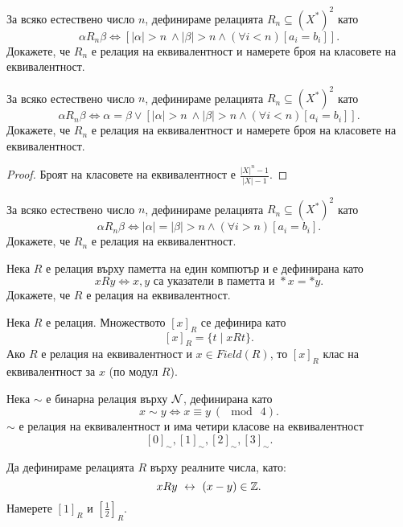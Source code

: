 \begin{problem}
  За всяко естествено число $n$, дефинираме релацията $R_n \subseteq (X^*)^2$ като
  \[\alpha R_n \beta \iff [|\alpha| > n\ \wedge |\beta| > n\wedge (\forall i < n)[a_i = b_i]].\]
  Докажете, че $R_n$ е релация на еквивалентност и намерете броя на класовете на еквивалентност.
\end{problem}

\begin{problem}
  За всяко естествено число $n$, дефинираме релацията $R_n \subseteq (X^*)^2$ като
  \[\alpha R_n \beta \iff \alpha = \beta \vee [|\alpha| > n\ \wedge |\beta| > n\wedge (\forall i < n)[a_i = b_i]].\]
  Докажете, че $R_n$ е релация на еквивалентност и намерете броя на класовете на еквивалентност.
\end{problem}
\begin{proof}
  Броят на класовете на еквивалентност е $\frac{|X|^n - 1}{|X| - 1}$.
\end{proof}


\begin{problem}
  За всяко естествено число $n$, дефинираме релацията $R_n \subseteq (X^*)^2$ като
  \[\alpha R_n \beta \iff |\alpha| = |\beta| > n\wedge (\forall i > n)[a_i = b_i].\]
  Докажете, че $R_n$ е релация на еквивалентност.
\end{problem}

\begin{problem}
  Нека $R$ е релация върху паметта на един компютър и е дефинирана като
  \[xRy \iff x,y\mbox{ са указатели в паметта и }*x = *y.\]
  Докажете, че $R$ е релация на еквивалентност.
\end{problem}



\begin{dfn}
  Нека $R$ е релация.
  Множеството $[x]_R$ се дефинира като
  \[[x]_R = \{t\mid xRt\}.\]
  Ако $R$ е релация на еквивалентност и $x\in Field(R)$, то $[x]_R$ клас на еквивалентност за $x$ (по модул $R$).
\end{dfn}

\begin{example}
  Нека $\sim$ е бинарна релация върху $\mathcal{N}$, дефинирана като
  \[x\sim y \iff x\equiv y\ (\mod\ 4).\]
  $\sim$ е релация на еквивалентност и има четири класове на еквивалентност
  \[[0]_\sim, [1]_\sim, [2]_\sim, [3]_\sim.\]
\end{example}

\begin{problem}
  Да дефинираме релацията $R$ върху реалните числа, като:
  \[xRy \ \leftrightarrow\  (x-y)\in\mathbb{Z}.\]
  Намерете $[1]_R$ и $[\frac{1}{2}]_R$.
\end{problem}


